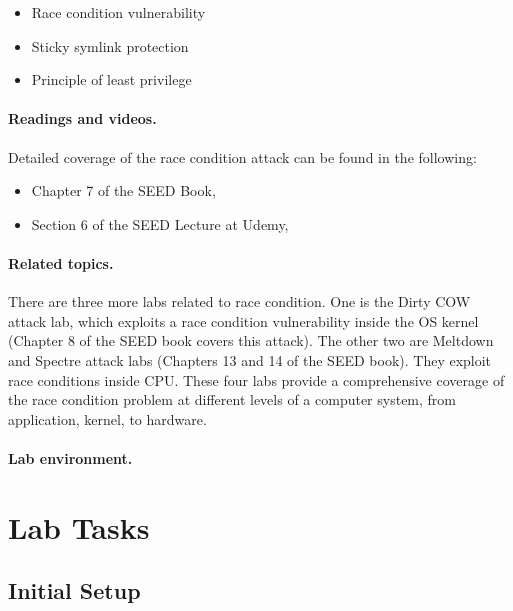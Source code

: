 \begin{itemize}[noitemsep]
\item Race condition vulnerability
\item Sticky symlink protection
\item Principle of least privilege
\end{itemize}




\paragraph{Readings and videos.}
Detailed coverage of the race condition attack can be found in the following:

\begin{itemize}
\item Chapter 7 of the SEED Book, \seedbook
\item Section 6 of the SEED Lecture at Udemy, \seedcsvideo
\end{itemize}


\paragraph{Related topics.}
There are three more labs related to race condition. One 
is the Dirty COW attack lab, which exploits a race condition vulnerability
inside the OS kernel (Chapter 8 of the SEED book covers this attack).
The other two are Meltdown and Spectre attack labs (Chapters 13 and 14 
of the SEED book). They exploit 
race conditions inside CPU. These four labs provide 
a comprehensive coverage of the race condition problem at 
different levels of a computer system, from application, kernel, 
to hardware. 


\paragraph{Lab environment.} \seedenvironment


\section{Lab Tasks}


\subsection{Initial Setup}


